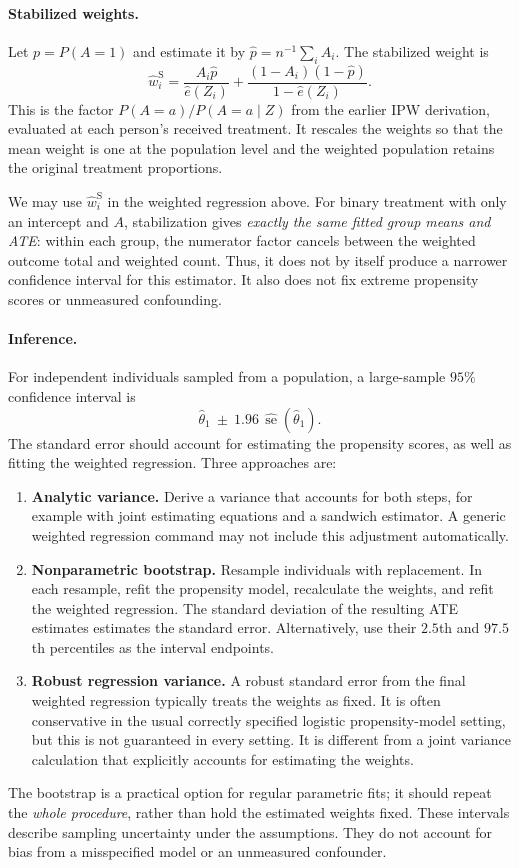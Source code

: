 \documentclass[11pt,twoside]{article}
\begin{document}
\paragraph{Stabilized weights.}
Let $p=P(A=1)$ and estimate it by $\hat p=n^{-1}\sum_i A_i$. The stabilized weight is
\[
 \hat w_i^{\mathrm S}
 =\frac{A_i\hat p}{\hat e(Z_i)}
 +\frac{(1-A_i)(1-\hat p)}{1-\hat e(Z_i)}.
\]
This is the factor $P(A=a)/P(A=a\mid Z)$ from the earlier IPW derivation, evaluated at each person's received treatment. It rescales the weights so that the mean weight is one at the population level and the weighted population retains the original treatment proportions.

We may use $\hat w_i^{\mathrm S}$ in the weighted regression above. For binary treatment with only an intercept and $A$, stabilization gives \emph{exactly the same fitted group means and ATE}: within each group, the numerator factor cancels between the weighted outcome total and weighted count. Thus, it does not by itself produce a narrower confidence interval for this estimator. It also does not fix extreme propensity scores or unmeasured confounding.

\paragraph{Inference.}
For independent individuals sampled from a population, a large-sample $95\%$ confidence interval is
\[
 \hat\theta_1\ \pm\ 1.96\,\widehat{\operatorname{se}}(\hat\theta_1).
\]
The standard error should account for estimating the propensity scores, as well as fitting the weighted regression. Three approaches are:
\begin{enumerate}
 \item \textbf{Analytic variance.} Derive a variance that accounts for both steps, for example with joint estimating equations and a sandwich estimator. A generic weighted regression command may not include this adjustment automatically.
 \item \textbf{Nonparametric bootstrap.} Resample individuals with replacement. In each resample, refit the propensity model, recalculate the weights, and refit the weighted regression. The standard deviation of the resulting ATE estimates estimates the standard error. Alternatively, use their $2.5$th and $97.5$th percentiles as the interval endpoints.
 \item \textbf{Robust regression variance.} A robust standard error from the final weighted regression typically treats the weights as fixed. It is often conservative in the usual correctly specified logistic propensity-model setting, but this is not guaranteed in every setting. It is different from a joint variance calculation that explicitly accounts for estimating the weights.
\end{enumerate}
The bootstrap is a practical option for regular parametric fits; it should repeat the \emph{whole procedure}, rather than hold the estimated weights fixed. These intervals describe sampling uncertainty under the assumptions. They do not account for bias from a misspecified model or an unmeasured confounder.

\clearpage


\end{document}
